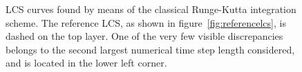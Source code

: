 \begin{figure}[htpb]
    \centering
    
    \caption[LCS curves found by means of the classical Runge-Kutta integration scheme]{
        LCS curves found by means of the classical Runge-Kutta integration scheme. The
        reference LCS, as shown in figure~\ref{fig:referencelcs},
        is dashed on the top layer. One of the very few visible
        discrepancies belongs to the second largest numerical time step length
        considered, and is located in the lower left corner.}
    \label{fig:lcs_rk4}
\end{figure}
